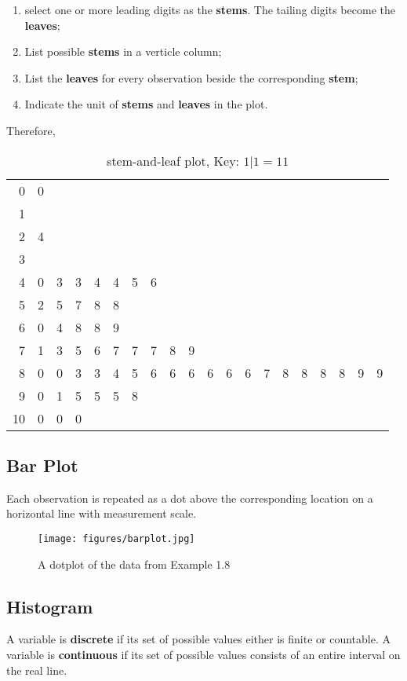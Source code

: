 \begin{enumerate}
  \item select one or more leading digits as the \textbf{stems}. The tailing digits become the \textbf{leaves};
  \item List possible \textbf{stems} in a verticle column;
  \item List the \textbf{leaves} for every observation beside the corresponding \textbf{stem};
  \item Indicate the unit of \textbf{stems} and \textbf{leaves} in the plot.
\end{enumerate}

Therefore,
\begin{table}[H]
\centering
\caption{stem-and-leaf plot, Key: $1 | 1= 11$}
\begin{tabular}{r|lllllllllllllllllll}
    0     & 0   \\
    1     \\
    2     & 4   \\
    3     \\
    4     & 0   & 3   & 3   & 4   & 4   & 5   & 6  \\
    5     & 2   & 5   & 7   & 8   & 8  \\
    6     & 0   & 4   & 8   & 8   & 9\\
    7     & 1   & 3   & 5   & 6   & 7   & 7   & 7   & 8   & 9   \\
    8     & 0   & 0   & 3   & 3   & 4   & 5   & 6   & 6   & 6   & 6   & 6   & 6   & 7   & 8   & 8   & 8   & 8   & 9   & 9  \\
    9     & 0   & 1   & 5   & 5   & 5   & 8   \\
    10    & 0   & 0   & 0 \\
\end{tabular}
\end{table}


\subsection{Bar Plot}
Each observation is repeated as a dot above the corresponding location on a horizontal line with measurement scale.

\begin{figure}[H]
\centering
\texttt{[image: figures/barplot.jpg]}
\caption{A dotplot of the data from Example 1.8}
\label{fig:1}
\end{figure}


\subsection{Histogram}
\begin{defn}
A variable is \textbf{discrete} if its set of possible values either is finite or countable.
A variable is \textbf{continuous} if its set of possible values consists of an entire interval on the real line.
\end{defn}

